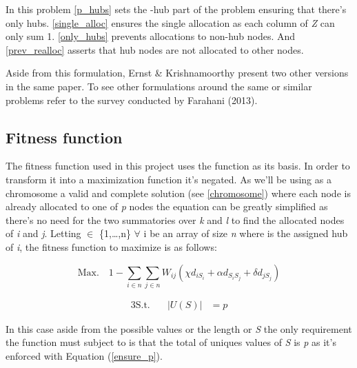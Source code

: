 In this problem \eqref{p_hubs} sets the \ip-hub part of the problem
ensuring that there's only \ip hubs. \eqref{single_alloc} ensures the single
allocation as each column of \emph{Z} can only sum 1. \eqref{only_hubs} prevents
allocations to non-hub nodes. And \eqref{prev_realloc} asserts that hub
nodes are not allocated to other nodes.

Aside from this formulation, Ernst \& Krishnamoorthy present two other versions in the
same paper\cite{Ernst1996}. To see other formulations around the same or similar problems
refer to the survey conducted by Farahani (2013)\cite{Farahani2013}.

\subsection{Fitness function}

The fitness function used in this project uses the  function as its basis.
In order to transform it into a maximization function it's negated. As we'll be using as a
chromosome a valid and complete solution (see \ref{chromosome}) 
where each node is already allocated to one of \emph{p} nodes the equation can be greatly
simplified as there's no need for the two summatories over \emph{k} and \emph{l} to find the
allocated nodes of \emph{i} and \emph{j}. Letting  $\in$ \{1,\dots,n\} $\forall$ i be an
array of size \emph{n} where  is the assigned hub of \emph{i}, the fitness
function to maximize is as follows:


\[
  \text{Max.} \quad 1 - \sum_{i \in n} \sum_{j \in n} W_{ij} (\chi d_{iS_{i}} + \alpha d_{S_{i}S_{j}} + \delta d_{jS_{j}})
\]

\begin{alignat}{3}
  \text{S.t.} \quad & |U(S)|  &= p \label{ensure_p}
\end{alignat}

In this case aside from the possible values or the length or \emph{S} the only requirement
the function must subject to is that the total of uniques values of \emph{S} is \emph{p}
as it's enforced with Equation (\ref{ensure_p}).



